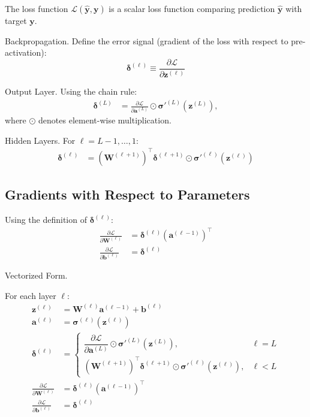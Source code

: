 \documentclass[12pt]{article}
\newcommand{\eL}{\mathcal{L}}
\newcommand{\bW}{\mathbf{W}}
\newcommand{\ba}{\mathbf{a}}
\newcommand{\bb}{\mathbf{b}}
\newcommand{\by}{\mathbf{y}}
\newcommand{\bz}{\mathbf{z}}
\begin{document}
The loss function $\eL(\hat{\by}, \by)$ is a scalar loss function comparing prediction
$\hat{\by}$ with target $\by$.

Backpropagation. Define the error signal (gradient of the loss with respect to pre-activation):
\[
\boldsymbol{\delta}^{(\ell)} \equiv \frac{\partial \mathcal{L}}{\partial \bz^{(\ell)}}
\]

Output Layer. Using the chain rule:
\begin{align}
\boldsymbol{\delta}^{(L)}
&= \frac{\partial \eL}{\partial \ba^{(L)}}
\odot \boldsymbol{\sigma}'^{(L)}\!\left(\bz^{(L)}\right),
\end{align}
where $\odot$ denotes element-wise multiplication.

Hidden Layers. For $\ell = L-1, \dots, 1$:
\begin{align}
\boldsymbol{\delta}^{(\ell)}
&= \left( \bW^{(\ell+1)} \right)^{\!\top} \boldsymbol{\delta}^{(\ell+1)}
\odot {\boldsymbol\sigma}'^{(\ell)}\!\left(\bz^{(\ell)}\right)
\end{align}

\subsection*{Gradients with Respect to Parameters}

Using the definition of $\boldsymbol{\delta}^{(\ell)}$:
\begin{align}
\frac{\partial \mathcal{L}}{\partial \bW^{(\ell)}}
&= \boldsymbol{\delta}^{(\ell)} \left( \ba^{(\ell-1)} \right)^{\!\top} \\
\frac{\partial \mathcal{L}}{\partial \bb^{(\ell)}}
&= \boldsymbol{\delta}^{(\ell)}
\end{align}

Vectorized Form.

For each layer $\ell$:
\[
\begin{aligned}
\bz^{(\ell)} &= \bW^{(\ell)} \ba^{(\ell-1)} + \bb^{(\ell)} \\
\ba^{(\ell)} &= {\boldsymbol\sigma}^{(\ell)}(\bz^{(\ell)}) \\
\boldsymbol{\delta}^{(\ell)} &=
\begin{cases}
\dfrac{\partial \mathcal{L}}{\partial \ba^{(L)}} \odot \boldsymbol{\sigma}'^{(L)}(\bz^{(L)}), & \ell = L \\
\left( \bW^{(\ell+1)} \right)^{\!\top} \boldsymbol{\delta}^{(\ell+1)}
\odot {\boldsymbol\sigma}'^{(\ell)}(\bz^{(\ell)}), & \ell < L
\end{cases} \\
\frac{\partial \mathcal{L}}{\partial \bW^{(\ell)}} &= \boldsymbol{\delta}^{(\ell)} (\ba^{(\ell-1)})^\top \\
\frac{\partial \mathcal{L}}{\partial \bb^{(\ell)}} &= \boldsymbol{\delta}^{(\ell)}
\end{aligned}
\]
\end{document}
